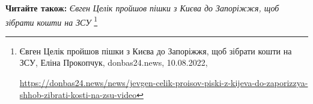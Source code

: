  
 
 
 
 

\textbf{Читайте також:} \emph{Євген Целік пройшов пішки з Києва до Запоріжжя, щоб зібрати кошти на ЗСУ}%
\footnote{Євген Целік пройшов пішки з Києва до Запоріжжя, щоб зібрати кошти на ЗСУ, Еліна Прокопчук, donbas24.news, 10.08.2022, \par%
\url{https://donbas24.news/news/jevgen-celik-proisov-piski-z-kijeva-do-zaporizzya-shhob-zibrati-kosti-na-zsu-video}%
}
